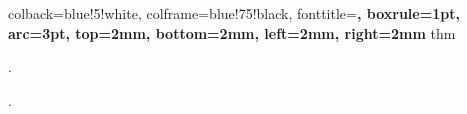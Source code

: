 \usepackage{amsmath}
\usepackage{amsthm}
\usepackage[many]{tcolorbox}

\theoremstyle{definition}
\newtheorem{observation}{Observación}[section]

%
{
colback=blue!5!white,
colframe=blue!75!black,
fonttitle=\bfseries,
boxrule=1pt,
arc=3pt,
top=2mm, bottom=2mm,
left=2mm, right=2mm
}{thm}

  {\topsep}   %
  {\topsep}   %
  {\normalfont}%
  {}          %
  {\bfseries} %
  {.}         %
  {\newline}  %
  {}          %

\theoremstyle{definitionbreak} 
\newtheorem{definition}{Definition}[section]

  {\topsep}   %
  {\topsep}   %
  {\normalfont}%
  {}          %
  {\bfseries} %
  {.}         %
  {\newline}  %
  {}          %

\theoremstyle{propertybreak} 
\newtheorem{property}{Propiedad}[section]